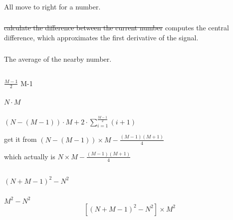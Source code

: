\documentclass{article}
\begin{document}
\subsubsection{}
All move to right for a number.

\subsubsection{}
\sout{calculate the difference between the current number} computes the central difference, which approximates the first derivative of the signal.

\subsubsection{}
The average of the nearby number.


\subsection{}
\subsubsection{}
\sout{\(\frac{M-1}{2}\)} M-1

\subsubsection{}
\(N\cdot M\)

\subsubsection{}
\sout{\((N-(M-1))\cdot M+2\cdot \sum_{i=1}^{\frac{M-1}{2}}(i+1)\)}


get it from \((N-(M-1))\times M - \frac{(M-1)(M+1)}{4}\)

which actually is \(N\times M - \frac{(M-1)(M+1)}{4}\)

\subsection{}
\subsubsection{}
\((N+M-1)^2-N^2\)

\subsubsection{}
\sout{\(M^2 - N^2\)} \[[(N + M - 1)^2 - N^2] \times M^2\]
\end{document}
